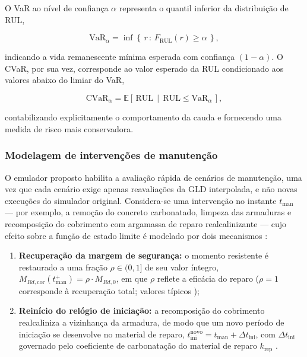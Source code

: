 O VaR ao nível de confiança $\alpha$ representa o quantil inferior da distribuição de RUL,

\begin{equation}
\mathrm{VaR}_\alpha = \inf\left\{\, r \,:\, F_{\mathrm{RUL}}(r) \geq \alpha \,\right\},
\label{eq:var}
\end{equation}

\noindent indicando a vida remanescente mínima esperada com confiança $(1-\alpha)$. O CVaR, por sua vez, corresponde ao valor esperado da RUL condicionado aos valores abaixo do limiar do VaR,

\begin{equation}
\mathrm{CVaR}_\alpha = \mathbb{E}\left[\, \mathrm{RUL} \,\middle|\, \mathrm{RUL} \leq \mathrm{VaR}_\alpha \,\right],
\label{eq:cvar}
\end{equation}

\noindent contabilizando explicitamente o comportamento da cauda e fornecendo uma medida de risco mais conservadora.

\subsubsection{Modelagem de interven\c{c}\~oes de manuten\c{c}\~ao}
\label{subsec:manutencao}

O emulador proposto habilita a avaliação rápida de cenários de manutenção, uma vez que cada cenário exige apenas reavaliações da GLD interpolada, e não novas execuções do simulador original. Considera-se uma intervenção no instante $t_{\mathrm{man}}$ --- por exemplo, a remoção do concreto carbonatado, limpeza das armaduras e recomposição do cobrimento com argamassa de reparo realcalinizante --- cujo efeito sobre a função de estado limite é modelado por dois mecanismos \parencite{frangopol2011, vannoortwijk2009}:

\begin{enumerate}
    \item \textbf{Recuperação da margem de segurança:} o momento resistente é restaurado a uma fração $\rho \in (0, 1]$ de seu valor íntegro, $M_{Rd,\mathrm{cor}}(t_{\mathrm{man}}^{+}) = \rho \cdot M_{Rd,0}$, em que $\rho$ reflete a eficácia do reparo ($\rho = 1$ corresponde à recuperação total; valores típicos );
    \item \textbf{Reinício do relógio de iniciação:} a recomposição do cobrimento realcaliniza a vizinhança da armadura, de modo que um novo período de iniciação se desenvolve no material de reparo, $t_{\mathrm{ini}}^{\mathrm{novo}} = t_{\mathrm{man}} + \Delta t_{\mathrm{ini}}$, com $\Delta t_{\mathrm{ini}}$ governado pelo coeficiente de carbonatação do material de reparo $k_{\mathrm{rep}}$ .
\end{enumerate}

